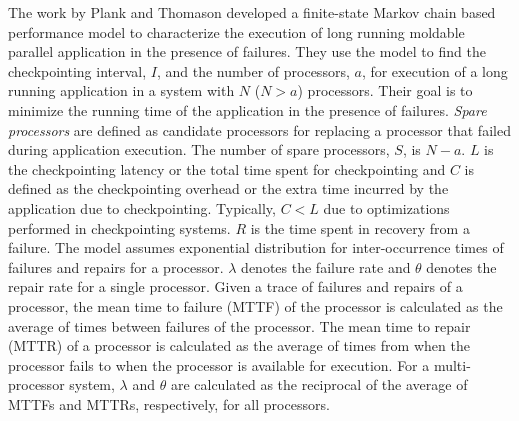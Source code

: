 \documentclass[conference,10pt]{IEEEtran}
\begin{document}
The work by Plank and Thomason\cite{plank-processorallocation-jpdc01}
developed a finite-state Markov chain based performance model to
characterize the execution of long running moldable parallel
application in the presence of failures. They use the model to find
the checkpointing interval, $I$, and the number of processors, $a$,
for execution of a long running application in a system with $N$
($N>a$) processors. Their goal is to minimize the running time of the
application in the presence of failures. {\em Spare processors} are
defined as candidate processors for replacing a processor that failed
during application execution. The number of spare processors, $S$, is
$N-a$. $L$ is the checkpointing latency or the total time spent for
checkpointing and $C$ is defined as the checkpointing overhead or the
extra time incurred by the application due to
checkpointing. Typically, $C<L$ due to optimizations performed in
checkpointing systems. $R$ is the time spent in recovery from a
failure. The model assumes exponential distribution for
inter-occurrence times of failures and repairs for a
processor. $\lambda$ denotes the failure rate and $\theta$ denotes the
repair rate for a single processor. Given a trace of failures and
repairs of a processor, the mean time to failure (MTTF) of the
processor is calculated as the average of times between failures of
the processor. The mean time to repair (MTTR) of a processor is
calculated as the average of times from when the processor fails to
when the processor is available for execution. For a multi-processor
system, $\lambda$ and $\theta$ are calculated as the reciprocal of the
average of MTTFs and MTTRs, respectively, for all processors.
\end{document}
